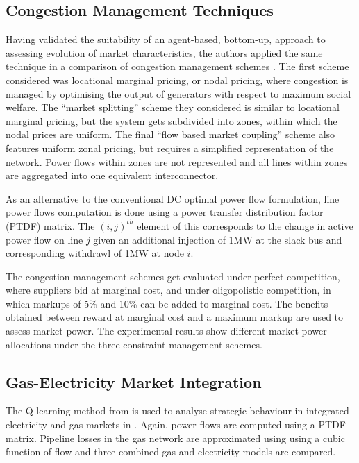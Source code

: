 \subsection{Congestion Management Techniques}
Having validated the suitability of an agent-based, bottom-up, approach to
assessing evolution of market characteristics, the authors applied the same
technique in a comparison of congestion management schemes \cite{krause:cong}.
The first scheme considered was locational marginal pricing, or nodal
pricing, where congestion is managed by optimising the output of generators
with respect to maximum social welfare.
The ``market splitting'' scheme they considered is similar to locational
marginal pricing, but the system gets subdivided into zones, within which the
nodal prices are uniform.  The final ``flow based market coupling'' scheme
also features uniform zonal pricing, but requires a simplified representation
of the network.  Power flows within zones are not represented and all lines
within zones are aggregated into one equivalent interconnector.

As an alternative to the conventional DC optimal power flow formulation, line
power flows computation is done using a power transfer distribution
factor (PTDF) matrix.  The $(i,j)^{th}$ element of this corresponds to
the change in active power flow on line $j$ given an additional injection of
1MW at the slack bus and corresponding withdrawl of 1MW at node $i$.

The congestion management schemes get evaluated under perfect competition,
where suppliers bid at marginal cost, and under oligopolistic competition, in
which markups of 5\% and 10\% can be added to marginal cost.  The benefits
obtained between reward at marginal cost and a maximum markup are used to
assess market power.  The experimental results show different market power
allocations under the three constraint management schemes.

\subsection{Gas-Electricity Market Integration}
The Q-learning method from \cite{krause:nash04,krause:nash06} is used to
analyse strategic behaviour in integrated electricity and gas markets in
\cite{krause:gas}.  Again, power flows are computed using a PTDF matrix.
Pipeline losses in the gas network are approximated using using a cubic
function of flow and three combined gas and electricity models are
compared.

